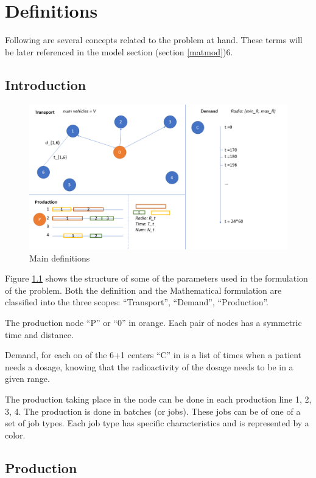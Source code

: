 \chapter{Definitions}
\label{def}

Following are several concepts related to the problem at hand. These terms will be later referenced in the model section (section \ref{matmod})6.

\section{Introduction}

\begin{figure}
	\centering
		\includegraphics[width=\textwidth]{imagenes/definitions.png}
	\caption{Main definitions}
	\label{fig:definitions}
\end{figure}

Figure \ref{fig:definitions} shows the structure of some of the parameters used in the formulation of the problem. Both the definition and the Mathematical formulation are classified into the three scopes: "`Transport"', "`Demand"', "`Production"'.

The production node "`P"' or "`0"' in orange. Each pair of nodes has a symmetric time and distance.

Demand, for each on of the 6+1 centers "`C"' in is a list of times when a patient needs a dosage, knowing that the radioactivity of the dosage needs to be in a given range.

The production taking place in the node can be done in each production line {1, 2, 3, 4}.
The production is done in batches (or jobs). These jobs can be of one of a set of job types. Each job type has specific characteristics and is represented by a color.

\section{Production}

